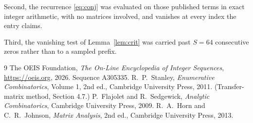 \documentclass[11pt,a4paper]{article}
\theoremstyle{plain}
\theoremstyle{definition}
\begin{document}
Second, the recurrence \eqref{eq:conj} was evaluated on those published terms in exact
integer arithmetic, with no matrices involved, and vanishes at every index the entry claims.

Third, the vanishing test of Lemma~\ref{lem:crit} was carried past $S=64$ consecutive
zeros rather than to a sampled prefix.

\begin{thebibliography}{9}
 The OEIS Foundation, \emph{The On-Line Encyclopedia of Integer
Sequences}, \url{https://oeis.org}, 2026. Sequence A305335.
 R.~P.~Stanley, \emph{Enumerative Combinatorics}, Volume 1, 2nd ed.,
Cambridge University Press, 2011. (Transfer-matrix method, Section 4.7.)
 P.~Flajolet and R.~Sedgewick, \emph{Analytic Combinatorics}, Cambridge
University Press, 2009.
 R.~A.~Horn and C.~R.~Johnson, \emph{Matrix Analysis}, 2nd ed., Cambridge
University Press, 2013.
\end{thebibliography}
\end{document}
